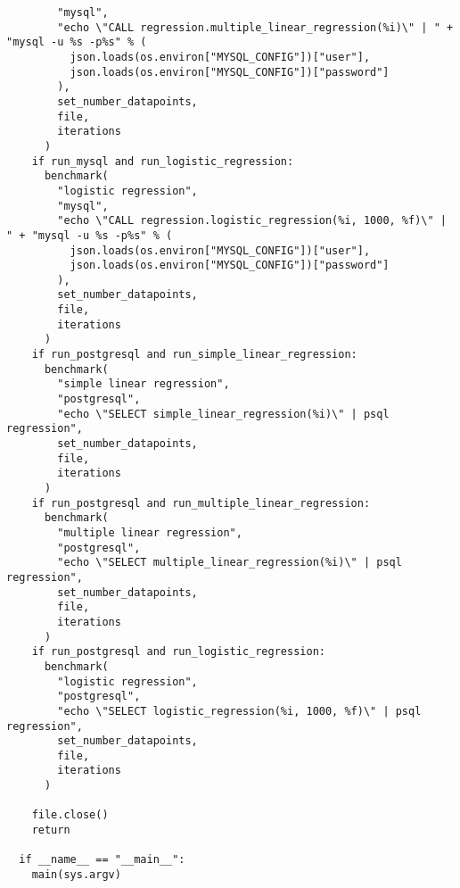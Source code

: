 \begin{verbatim}
        "mysql",
        "echo \"CALL regression.multiple_linear_regression(%i)\" | " + "mysql -u %s -p%s" % (
          json.loads(os.environ["MYSQL_CONFIG"])["user"],
          json.loads(os.environ["MYSQL_CONFIG"])["password"]
        ),
        set_number_datapoints,
        file,
        iterations
      )
    if run_mysql and run_logistic_regression:
      benchmark(
        "logistic regression",
        "mysql",
        "echo \"CALL regression.logistic_regression(%i, 1000, %f)\" | " + "mysql -u %s -p%s" % (
          json.loads(os.environ["MYSQL_CONFIG"])["user"],
          json.loads(os.environ["MYSQL_CONFIG"])["password"]
        ),
        set_number_datapoints,
        file,
        iterations
      )
    if run_postgresql and run_simple_linear_regression:
      benchmark(
        "simple linear regression",
        "postgresql",
        "echo \"SELECT simple_linear_regression(%i)\" | psql regression",
        set_number_datapoints,
        file,
        iterations
      )
    if run_postgresql and run_multiple_linear_regression:
      benchmark(
        "multiple linear regression",
        "postgresql",
        "echo \"SELECT multiple_linear_regression(%i)\" | psql regression",
        set_number_datapoints,
        file,
        iterations
      )
    if run_postgresql and run_logistic_regression:
      benchmark(
        "logistic regression",
        "postgresql",
        "echo \"SELECT logistic_regression(%i, 1000, %f)\" | psql regression",
        set_number_datapoints,
        file,
        iterations
      )

    file.close()
    return

  if __name__ == "__main__":
    main(sys.argv)
\end{verbatim}
